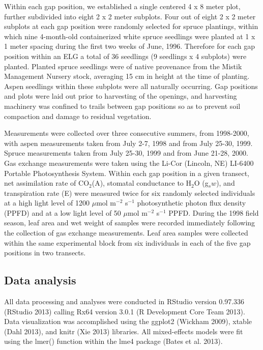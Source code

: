 \documentclass{article}\usepackage[]{graphicx}\usepackage[]{color}
\begin{document}
\begin{multicols}{2}
Within each gap position, we established a single centered 4 x 8 meter plot, further subdivided into eight 2 x 2 meter subplots. Four out of eight 2 x 2 meter subplots at each gap position were randomly selected for spruce plantings, within which nine 4-month-old containerized white spruce seedlings were planted at 1 x 1 meter spacing during the first two weeks of June, 1996. Therefore for each gap position within an ELG a total of 36 seedlings (9 seedlings x 4 subplots) were planted. Planted spruce seedlings were of native provenance from the Mistik Management Nursery stock, averaging 15 cm in height at the time of planting. Aspen seedlings within these subplots were all naturally occurring. Gap positions and plots were laid out prior to harvesting of the openings, and harvesting machinery was confined to trails between gap positions so as to prevent soil compaction and damage to residual vegetation.

Measurements were collected over three consecutive summers, from 1998-2000, with aspen measurements taken from July 2-7, 1998 and from July 25-30, 1999. Spruce measurements taken from July 25-30, 1999 and from June 21-28, 2000. Gas exchange measurements were taken using the Li-Cor (Lincoln, NE) LI-6400 Portable Photosynthesis System. Within each gap position in a given transect, net assimilation rate of CO$_2$(A), stomatal conductance to H$_2$O (g$_sw$), and transpiration rate (E) were measured twice for six randomly selected individuals at a high light level of 1200 $\mu$mol m$^{-2}$ s$^{-1}$ photosynthetic photon flux density (PPFD) and at a low light level of 50 $\mu$mol m$^{-2}$ s$^{-1}$ PPFD. During the 1998 field season, leaf area and wet weight of samples were recorded immediately following the collection of gas exchange measurements. Leaf area samples were collected within the same experimental block from six individuals in each of the five gap positions in two transects.

\subsection{Data analysis}

All data processing and analyses were conducted in RStudio version 0.97.336 (RStudio 2013) calling Rx64 version 3.0.1 (R Development Core Team 2013). Data visualization was accomplished using the ggplot2 (Wickham 2009), xtable (Dahl 2013), and knitr (Xie 2013) libraries. All mixed-effects models were fit using the lmer() function within the lme4 package (Bates et al. 2013).




\end{multicols}
\end{document}
